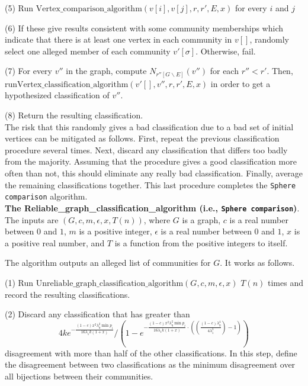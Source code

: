 \documentclass[11pt]{article}
\newcommand{\1}{\mathbb{1}}
\begin{document}
(5) Run $\text{Vertex\_comparison\_algorithm}(v[i],v[j],r,r',E,x)$ for every $i$ and $j$

(6) If these give results consistent with some community memberships which indicate that there is at least one vertex in each community in $v[]$, randomly select one alleged member of each community $v'[\sigma]$. Otherwise, fail.

(7) For every $v''$ in the graph, compute $N_{r''[G\backslash E]}(v'')$ for each $r''<r'$. Then, run\newline $\text{Vertex\_classification\_algorithm}(v'[],v'', r,r',E,x)$ in order to get a hypothesized classification of $v''$.

(8) Return the resulting classification.\\

The risk that this randomly gives a bad classification due to a bad set of initial vertices can be mitigated as follows. First, repeat the previous classification procedure several times. Next, discard any classification that differs too badly from the majority. Assuming that the procedure gives a good classification more often than not, this should eliminate any really bad classification. Finally, average the remaining classifications together. This last procedure completes the {\tt Sphere comparison} algorithm.\\

\noindent
{\bf The Reliable\_graph\_classification\_algorithm (i.e., {\tt Sphere comparison})}. The inputs are $(G,c,m,\epsilon,x,T(n))$, where $G$ is a graph, $c$ is a real number between $0$ and $1$, $m$ is a positive integer, $\epsilon$ is a real number between $0$ and $1$, $x$ is a positive real number, and $T$ is a function from the positive integers to itself. 

The algorithm outputs an alleged list of communities for $G$. It works as follows.

(1) Run $\text{Unreliable\_graph\_classification\_algorithm}(G,c,m,\epsilon,x)$ $T(n)$ times and record the resulting classifications.

(2) Discard any classification that has greater than $$4ke^{-\frac{(1-c)x^2\lambda_{\eta}^2\min p_i}{16\lambda_1 k(1+x)}}/(1-e^{-\frac{(1-c)x^2\lambda_{\eta}^2\min p_i}{16\lambda_1 k(1+x)}\cdot((\frac{(1-c)\lambda_{\eta}^4}{4\lambda_1^3})-1)})$$  disagreement with more than half of the other classifications. In this step, define the disagreement between two classifications as the minimum disagreement over all bijections between their communities.
\end{document}
